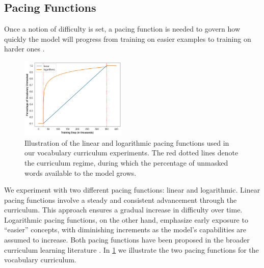 \subsection{Pacing Functions} 

Once a notion of difficulty is set, a pacing function is needed to govern how quickly the model will progress from training on easier examples to training on harder ones \cite{wu2021when}.

\begin{figure}
    \centering
    \includegraphics[width=0.45\textwidth]{chapters/climb/figures/pacing_fns.png}
    \caption{Illustration of the linear and logarithmic pacing functions used in our vocabulary curriculum experiments. The red dotted lines denote the curriculum regime, during which the percentage of unmasked words available to the model grows.}
    \label{fig:pacing_fn}
\end{figure}

We experiment with two different pacing functions: linear and logarithmic. Linear pacing functions involve a steady and consistent advancement through the curriculum. This approach ensures a gradual increase in difficulty over time. Logarithmic pacing functions, on the other hand, emphasize early exposure to ``easier'' concepts, with diminishing increments as the model's capabilities are assumed to increase. Both pacing functions have been proposed in the broader curriculum learning literature \citep{bai2022better, li2021curriculum, wu2021when}. In \cref{fig:pacing_fn} we illustrate the two pacing functions for the vocabulary curriculum.

